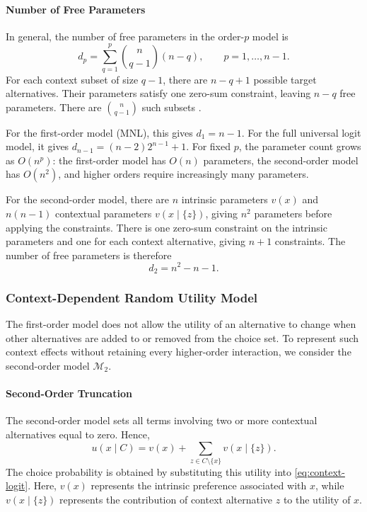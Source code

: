 \documentclass[11pt,a4paper]{article}
\begin{document}
\paragraph{Number of Free Parameters}

In general, the number of free parameters in the order-$p$ model is
\begin{equation}
    d_p=\sum_{q=1}^{p}\binom{n}{q-1}(n-q),
    \qquad p=1,\ldots,n-1.
    \label{eq:general-order-parameter-count}
\end{equation}
For each context subset of size $q-1$, there are $n-q+1$ possible
target alternatives. Their parameters satisfy one zero-sum constraint,
leaving $n-q$ free parameters. There are $\binom{n}{q-1}$ such subsets
\citep{seshadri2019}.

For the first-order model (MNL), this gives $d_1=n-1$. For the full universal logit model, it gives $d_{n-1}=(n-2)2^{n-1}+1$.
For fixed $p$, the parameter count grows as $O(n^p)$: the first-order
model has $O(n)$ parameters, the second-order model has $O(n^2)$,
and higher orders require increasingly many parameters.


For the second-order model, there are $n$ intrinsic parameters $v(x)$ and $n(n-1)$ contextual parameters $v(x\mid\{z\})$, giving $n^2$ parameters before applying the constraints. There is one zero-sum constraint on the intrinsic parameters and one for each context alternative, giving $n+1$ constraints. The number of free parameters is therefore
\begin{equation}
    d_2=n^2-n-1.
    \label{eq:second-order-parameter-count}
\end{equation}

\subsubsection[Full context-dependent model]{Context-Dependent Random Utility Model}
The first-order model does not allow the utility of an alternative to change
when other alternatives are added to or removed from the choice set. To
represent such context effects without retaining every higher-order
interaction, we consider the second-order model $\mathcal{M}_2$.
\paragraph{Second-Order Truncation}
The second-order model sets all terms involving two or more contextual alternatives equal to zero. Hence,
\begin{equation}
    u(x\mid C)=v(x)+\sum_{z\in C\setminus\{x\}}v(x\mid\{z\}).
    \label{eq:second-order-truncation}
\end{equation}
The choice probability is obtained by substituting this utility into \cref{eq:context-logit}.
Here, $v(x)$ represents the intrinsic preference associated with $x$, while
$v(x\mid\{z\})$ represents the contribution of context alternative $z$ to
the utility of $x$.
\end{document}
